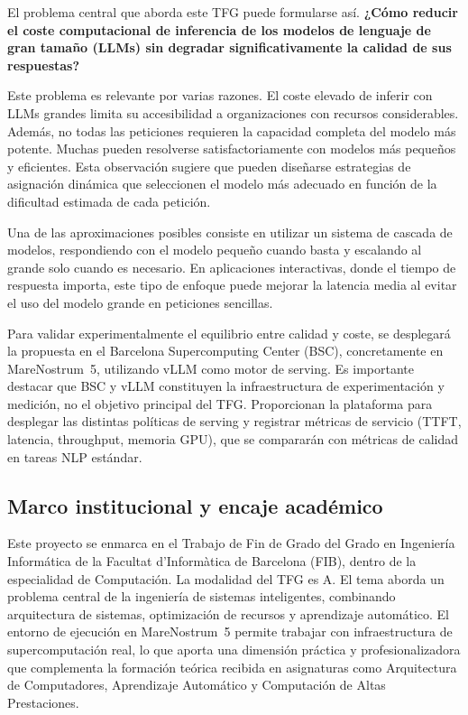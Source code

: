 \documentclass[11pt,a4paper]{article}
\begin{document}
El problema central que aborda este TFG puede formularse así. \textbf{¿Cómo reducir el coste computacional de inferencia de los modelos de lenguaje de gran tamaño (LLMs) sin degradar significativamente la calidad de sus respuestas?}

Este problema es relevante por varias razones. El coste elevado de inferir con LLMs grandes limita su accesibilidad a organizaciones con recursos considerables. Además, no todas las peticiones requieren la capacidad completa del modelo más potente. Muchas pueden resolverse satisfactoriamente con modelos más pequeños y eficientes. Esta observación sugiere que pueden diseñarse estrategias de asignación dinámica que seleccionen el modelo más adecuado en función de la dificultad estimada de cada petición.

Una de las aproximaciones posibles consiste en utilizar un sistema de cascada de modelos, respondiendo con el modelo pequeño cuando basta y escalando al grande solo cuando es necesario. En aplicaciones interactivas, donde el tiempo de respuesta importa, este tipo de enfoque puede mejorar la latencia media al evitar el uso del modelo grande en peticiones sencillas.

Para validar experimentalmente el equilibrio entre calidad y coste, se desplegará la propuesta en el Barcelona Supercomputing Center (BSC), concretamente en MareNostrum~5, utilizando vLLM como motor de serving. Es importante destacar que BSC y vLLM constituyen la infraestructura de experimentación y medición, no el objetivo principal del TFG. Proporcionan la plataforma para desplegar las distintas políticas de serving y registrar métricas de servicio (TTFT, latencia, throughput, memoria GPU), que se compararán con métricas de calidad en tareas NLP estándar.

\subsection{Marco institucional y encaje académico}

Este proyecto se enmarca en el Trabajo de Fin de Grado del Grado en Ingeniería Informática de la Facultat d'Informàtica de Barcelona (FIB), dentro de la especialidad de Computación. La modalidad del TFG es A. El tema aborda un problema central de la ingeniería de sistemas inteligentes, combinando arquitectura de sistemas, optimización de recursos y aprendizaje automático. El entorno de ejecución en MareNostrum~5 permite trabajar con infraestructura de supercomputación real, lo que aporta una dimensión práctica y profesionalizadora que complementa la formación teórica recibida en asignaturas como Arquitectura de Computadores, Aprendizaje Automático y Computación de Altas Prestaciones.
\end{document}
